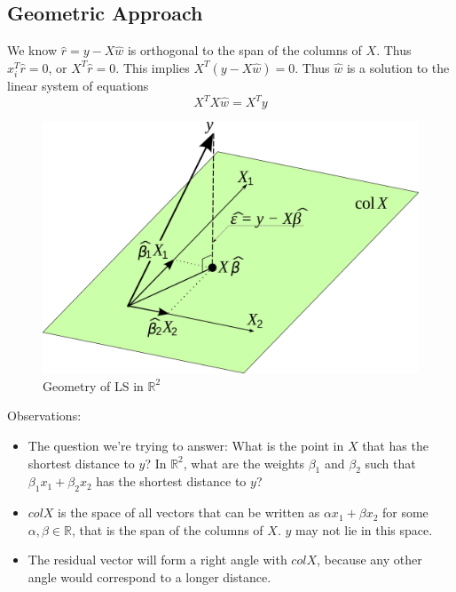 \documentclass[12pt]{article}
\theoremstyle{definition}
\newcommand{\R}{\mathbb{R}}
\begin{document}
\subsection{Geometric Approach}

We know $\hat r = y - X \hat w$ is orthogonal to the span of the columns of $X$. Thus $x_i^T \hat r = 0$, or $X^T \hat r = 0$. This implies $X^T (y - X \hat w) = 0$. Thus $\hat w$ is a solution to the linear system of equations
\begin{equation}
	X^T X \hat w = X^T y
\end{equation}

\begin{figure}[H]
	\begin{center}
		\includegraphics[scale=.1]{ls_geometry.png}
	\end{center}
	\caption{Geometry of LS in $\R^2$}
\end{figure}

Observations:
\begin{itemize}
	\item The question we're trying to answer: What is the point in $X$ that has the shortest distance to $y$? In $\R^2$, what are the weights $\beta_1$ and $\beta_2$ such that $\beta_1 x_1 + \beta_2 x_2$ has the shortest distance to $y$?
	\item $col X$ is the space of all vectors that can be written as $\alpha x_1 + \beta x_2$ for some $\alpha, \beta \in \R$, that is the span of the columns of $X$. $y$ may not lie in this space. 
	\item The residual vector will form a right angle with $col X$, because any other angle would correspond to a longer distance. 
\end{itemize}
\end{document}
